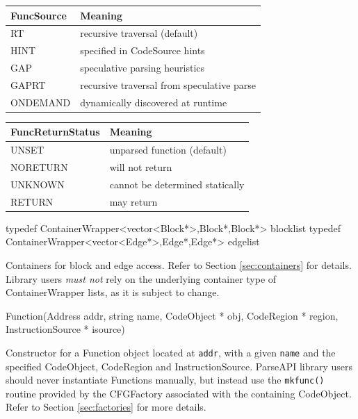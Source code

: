 \documentclass{article}
\newenvironment{apient}{\small\verbatim}{\endverbatim}
\newcommand{\apidesc}[1]{%
{\addtolength{\leftskip}{4em}%
#1\par\medskip}
}
\begin{document}
\begin{center}
\begin{tabular}{ll}
\toprule
FuncSource & Meaning \\
\midrule
RT & recursive traversal (default) \\
HINT & specified in CodeSource hints \\
GAP & speculative parsing heuristics \\
GAPRT & recursive traversal from speculative parse \\
ONDEMAND & dynamically discovered at runtime \\
\bottomrule
\end{tabular}
\end{center}

\begin{center}
\begin{tabular}{ll}
\toprule
FuncReturnStatus & Meaning \\
\midrule
UNSET & unparsed function (default) \\
NORETURN & will not return \\
UNKNOWN & cannot be determined statically \\
RETURN & may return \\
\bottomrule
\end{tabular}
\end{center}

\begin{apient}
typedef ContainerWrapper<vector<Block*>,Block*,Block*> blocklist
typedef ContainerWrapper<vector<Edge*>,Edge*,Edge*> edgelist
\end{apient}
\apidesc{Containers for block and edge access. Refer to Section \ref{sec:containers} for details. Library users \emph{must not} rely on the underlying container type of ContainerWrapper lists, as it is subject to change.}

\begin{apient}
Function(Address addr, 
    string name, 
    CodeObject * obj,
    CodeRegion * region, 
    InstructionSource * isource)
\end{apient}
\apidesc{Constructor for a Function object located at \texttt{addr}, with a given \texttt{name} and the specified CodeObject, CodeRegion and InstructionSource. ParseAPI library users should never instantiate Functions manually, but instead use the \texttt{mkfunc()} routine provided by the CFGFactory associated with the containing CodeObject. Refer to Section \ref{sec:factories} for more details.}
\end{document}
